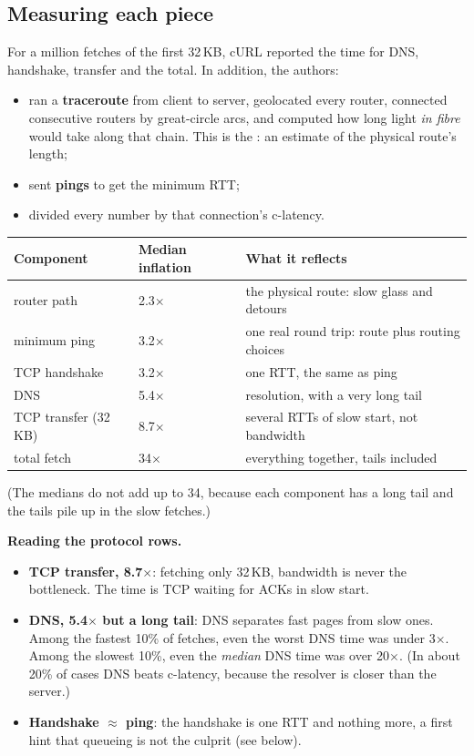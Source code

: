\subsection{Measuring each piece}
For a million fetches of the first 32\,KB, cURL reported the time for DNS, handshake, transfer and the total. In addition, the authors:
\begin{itemize}
  \item ran a \textbf{traceroute} from client to server, geolocated every router, connected consecutive routers by great-circle arcs, and computed how long light
        \emph{in fibre} would take along that chain. This is the : an estimate of the physical route's length;
  \item sent \textbf{pings} to get the minimum RTT;
  \item divided every number by that connection's c-latency.
\end{itemize}


\begin{center}
\begin{tabular}{@{}lll@{}}
\toprule
Component & Median inflation & What it reflects\\
\midrule
router path & 2.3$\times$ & the physical route: slow glass and detours\\
minimum ping & 3.2$\times$ & one real round trip: route plus routing choices\\
TCP handshake & 3.2$\times$ & one RTT, the same as ping\\
DNS & 5.4$\times$ & resolution, with a very long tail\\
TCP transfer (32\,KB) & 8.7$\times$ & several RTTs of slow start, not bandwidth\\
total fetch & 34$\times$ & everything together, tails included\\
\bottomrule
\end{tabular}
\end{center}
(The medians do not add up to 34, because each component has a long tail and the tails pile up in the slow fetches.)

\textbf{Reading the protocol rows.}
\begin{itemize}
  \item \textbf{TCP transfer, 8.7$\times$}: fetching only 32\,KB, bandwidth is never the bottleneck. The time is TCP waiting for ACKs in slow start.
  \item \textbf{DNS, 5.4$\times$ but a long tail}: DNS separates fast pages from slow ones. Among the fastest 10\% of fetches, even the worst DNS time was under 3$\times$.
        Among the slowest 10\%, even the \emph{median} DNS time was over 20$\times$. (In about 20\% of cases DNS beats c-latency, because the resolver is closer than the server.)
  \item \textbf{Handshake $\approx$ ping}: the handshake is one RTT and nothing more, a first hint that queueing is not the culprit (see below).
\end{itemize}

